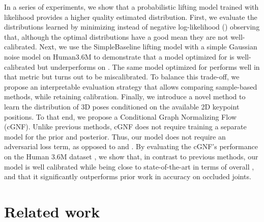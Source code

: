 \documentclass{article} \usepackage{iclr2023_conference,times}
\begin{document}
In a series of experiments, we show that a probabilistic lifting model trained with likelihood provides a higher quality estimated distribution.
First, we evaluate the distributions learned by minimizing  instead of negative log-likelihood () observing that, although the  optimal distributions have a good mean they are not well-calibrated.
Next, we use the SimpleBaseline \citep{martinez_2017_3dbaseline} lifting model with a simple Gaussian noise model on Human3.6M to demonstrate that a model optimized for  is well-calibrated but underperforms on . The same model optimized for  performs well in that metric but turns out to be miscalibrated. 
To balance this trade-off, we propose an interpretable evaluation strategy that allows comparing sample-based methods, while retaining calibration.
Finally, we introduce a novel method to learn the distribution of 3D poses conditioned on the available 2D keypoint positions.
To that end, we propose a Conditional Graph Normalizing Flow (cGNF).
Unlike previous methods, cGNF does not require training a separate model for the prior and posterior.
Thus, our model does not require an adversarial loss term, as opposed to \citet{Wehrbein_Rudolph_Rosenhahn_Wandt_2021} and \citet{kolotouros2021}.
By evaluating the cGNF's performance on the Human 3.6M dataset \citep{h36m_pami},
we show that, in contrast to previous methods, our model is well calibrated while being close to state-of-the-art in terms of overall , and that it significantly outperforms prior work in accuracy on occluded joints.

\section{Related work}
\end{document}
